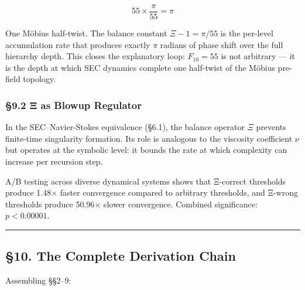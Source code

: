 \documentclass[
  11pt,
  a4paper]{article}
\begin{document}
\[55 \times \frac{\pi}{55} = \pi\]

One Möbius half-twist. The balance constant \(\Xi - 1 = \pi/55\) is the
per-level accumulation rate that produces exactly \(\pi\) radians of
phase shift over the full hierarchy depth. This closes the explanatory
loop: \(F_{10} = 55\) is not arbitrary --- it is the depth at which SEC
dynamics complete one half-twist of the Möbius pre-field topology.

\subsubsection{§9.2 Ξ as Blowup
Regulator}\label{ux3be-as-blowup-regulator}

In the SEC--Navier-Stokes equivalence (§6.1), the balance operator
\(\Xi\) prevents finite-time singularity formation. Its role is
analogous to the viscosity coefficient \(\nu\) but operates at the
symbolic level: it bounds the rate at which complexity can increase per
recursion step.

A/B testing across diverse dynamical systems shows that Ξ-correct
thresholds produce 1.48× faster convergence compared to arbitrary
thresholds, and Ξ-wrong thresholds produce 50.96× slower convergence.
Combined significance: \(p < 0.00001\).

\begin{center}\rule{0.5\linewidth}{0.5pt}\end{center}

\subsection{§10. The Complete Derivation
Chain}\label{the-complete-derivation-chain}

Assembling §§2--9:
\end{document}
